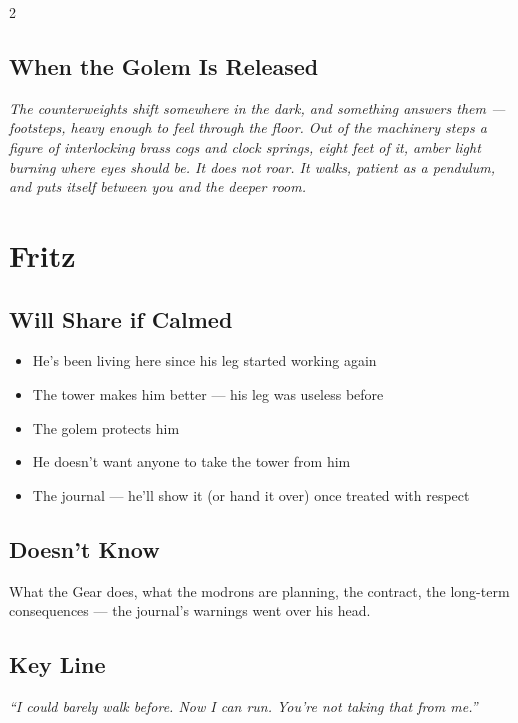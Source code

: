 \documentclass[10pt,letterpaper]{article}
\begin{document}
\begin{multicols}{2}
\subsection*{When the Golem Is Released}
\begin{readaloud}
\itshape
The counterweights shift somewhere in the dark, and something answers them --- footsteps, heavy enough to feel through the floor. Out of the machinery steps a figure of interlocking brass cogs and clock springs, eight feet of it, amber light burning where eyes should be. It does not roar. It walks, patient as a pendulum, and puts itself between you and the deeper room.
\end{readaloud}

\section*{Fritz}
\subsection*{Will Share if Calmed}
\begin{itemize}
\item He's been living here since his leg started working again
\item The tower makes him better --- his leg was useless before
\item The golem protects him
\item He doesn't want anyone to take the tower from him
\item The journal --- he'll show it (or hand it over) once treated with respect
\end{itemize}
\subsection*{Doesn't Know}
What the Gear does, what the modrons are planning, the contract, the long-term consequences --- the journal's warnings went over his head.
\subsection*{Key Line}
\textit{``I could barely walk before. Now I can run. You're not taking that from me.''}


\end{multicols}
\end{document}
